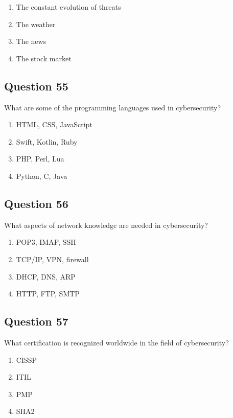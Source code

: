 \documentclass[12pt,a4paper]{article}
\begin{document}
\begin{enumerate}[label=\Alph*., leftmargin=*]
\item The constant evolution of threats
\item The weather
\item The news
\item The stock market
\end{enumerate}

\bigskip


\subsection*{Question 55}
What are some of the programming languages used in cybersecurity?

\begin{enumerate}[label=\Alph*., leftmargin=*]
\item HTML, CSS, JavaScript
\item Swift, Kotlin, Ruby
\item PHP, Perl, Lua
\item Python, C, Java
\end{enumerate}

\bigskip


\subsection*{Question 56}
What aspects of network knowledge are needed in cybersecurity?

\begin{enumerate}[label=\Alph*., leftmargin=*]
\item POP3, IMAP, SSH
\item TCP/IP, VPN, firewall
\item DHCP, DNS, ARP
\item HTTP, FTP, SMTP
\end{enumerate}

\bigskip


\subsection*{Question 57}
What certification is recognized worldwide in the field of cybersecurity?

\begin{enumerate}[label=\Alph*., leftmargin=*]
\item CISSP
\item ITIL
\item PMP
\item SHA2
\end{enumerate}
\end{document}
